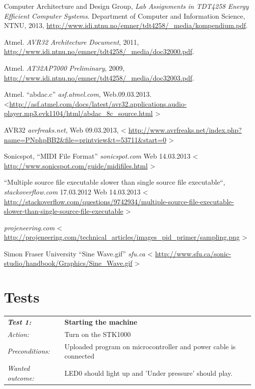 \documentclass[a4paper,12pt]{article}
\begin{document}
\clearpage

\begin{thebibliography}{9}

Computer Architecture and Design Group,
\emph{Lab Assignments in TDT4258 Energy Efficient Computer Systems}.
Department of Computer and Information Science, NTNU,
2013,
\url{http://www.idi.ntnu.no/emner/tdt4258/\_media/kompendium.pdf}.

Atmel.
\emph{AVR32 Architecture Document},
2011,
\url{http://www.idi.ntnu.no/emner/tdt4258/\_media/doc32000.pdf}.

Atmel.
\emph{AT32AP7000 Preliminary},
2009,
\url{http://www.idi.ntnu.no/emner/tdt4258/\_media/doc32003.pdf}.

Atmel. “abdac.c”
\emph{asf.atmel.com},
Web.09.03.2013.
\textless \url{http://asf.atmel.com/docs/latest/avr32.applications.audio-player.mp3.evk1104/html/abdac_8c_source.html}
\textgreater

AVR32
\emph{avrfreaks.net},
Web 09.03.2013,
\textless
\url{http://www.avrfreaks.net/index.php?name=PNphpBB2&file=printview&t=53711&start=0}
\textgreater

Sonicspot, “MIDI File Format”
\emph{sonicspot.com}
Web 14.03.2013
\textless
\url{http://www.sonicspot.com/guide/midifiles.html}
\textgreater


“Multiple source file executable slower than single source file executable“, 
\emph{stackoverflow.com}
17.03.2012 Web 14.03.2013
\textless
\url{http://stackoverflow.com/questions/9742934/multiple-source-file-executable-slower-than-single-source-file-executable}
\textgreater

\emph{projeneering.com}
\textless
\url{http://projeneering.com/technical_articles/images_pid_primer/sampling.png}
\textgreater

Simon Fraser University “Sine Wave.gif”
\emph{sfu.ca}
\textless
\url{http://www.sfu.ca/sonic-studio/handbook/Graphics/Sine_Wave.gif}
\textgreater
\end{thebibliography}

\clearpage
\appendix
{}
\section{Tests}

\begin{tabular}[h]{|lp{12cm}|} \hline
\textbf{\emph{Test 1:}} 		& \textbf{Starting the machine}\\
\emph{Action:} 		& Turn on the STK1000\\
\emph{Preconditions:}	& Uploaded program on microcontroller and power cable is connected\\
\emph{Wanted outcome:}	& LED0 should light up and 'Under pressure' should play. \\ \hline
\end{tabular}
\vspace{1cm}
\end{document}
